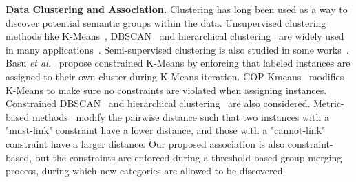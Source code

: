 \noindent\textbf{Data Clustering and Association.}
Clustering has long been used as a way to discover potential semantic groups within the data. Unsupervised clustering methods like K-Means~\cite{hartigan1979algorithm}, DBSCAN~\cite{ester1996density} and hierarchical clustering~\cite{johnson1967hierarchical, murtagh2012algorithms} are widely used in many applications~\cite{ge2020self, wang2022hierarchical, pu2023dynamic}. Semi-supervised clustering is also studied in some works~\cite{bair2013semi, bilenko2004integrating}. Basu \textit{et al.}~\cite{basu2002semi} propose constrained K-Means by enforcing that labeled instances are assigned to their own cluster during K-Means iteration. COP-Kmeans~\cite{wagstaff2001} modifies K-Means to make sure no constraints are violated when assigning instances. Constrained DBSCAN~\cite{ruiz2010density} and hierarchical clustering~\cite{davidson2005clustering} are also considered. Metric-based methods~\cite{yin2010semi, klein2002instance, xing2002distance, lange2005learning, pu2023dynamic, zhang2023promptcal} modify the pairwise distance such that two instances with a "must-link" constraint have a lower distance, and those with a "cannot-link" constraint have a larger distance. Our proposed association is also constraint-based, but the constraints are enforced during a threshold-based group merging process, during which new categories are allowed to be discovered.